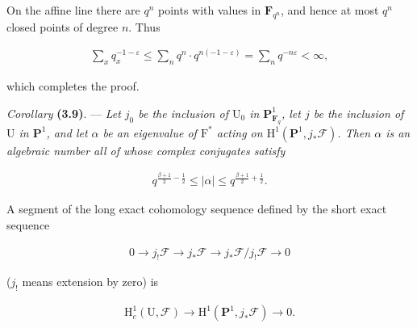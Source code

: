 \documentclass[10pt,leqno]{article}
\begin{document}
\noindent On the affine line there are \(q^{n}\) points with values in \(\mathbf{F}_{q^{n}}\), and hence at most \(q^{n}\) closed points of degree \(n\). Thus\par

\begin{equation*}\begin{gathered}\sum _{x} q_{x}^{- 1- \varepsilon } \leq  \sum _{n} q^{n}\cdot q^{n(- 1- \varepsilon )} = \sum _{n} q^{- n\varepsilon } < \infty ,\end{gathered}\end{equation*}

\noindent which completes the proof.\par

\noindent \emph{Corollary} \textbf{(3.9)}. — {\itshape Let \(j_{0}\) be the inclusion of \(\mathrm{U}_{0}\) in \(\mathbf{P}^{1}_{\mathbf{F}_{q}}\), let \(j\) be the inclusion of \(\mathrm{U}\) in \(\mathbf{P}^{1}\), and let \(\alpha \) be an eigenvalue of \(\mathrm{F}^{*}\) acting on \(\mathrm{H}^{1}(\mathbf{P}^{1},j_{*}\mathcal{F} )\). Then \(\alpha \) is an algebraic number all of whose complex conjugates satisfy}\par

\begin{equation*}\begin{gathered}q^{\frac{\beta+1}{2}- \frac{1}{2}} \leq  |\alpha | \leq  q^{\frac{\beta+1}{2}+\frac{1}{2}}.\end{gathered}\end{equation*}

\noindent \(\mathrm{A}\) segment of the long exact cohomology sequence defined by the short exact sequence\par

\begin{equation*}\begin{gathered}0 \longrightarrow  j_{!}\mathcal{F}  \longrightarrow  j_{*}\mathcal{F}  \longrightarrow  j_{*}\mathcal{F} /j_{!}\mathcal{F}  \longrightarrow  0\end{gathered}\end{equation*}

\noindent (\(j_{!}\) means extension by zero) is\par

\begin{equation*}\begin{gathered}\mathrm{H}_{c}^{1}(\mathrm{U},\mathcal{F} ) \longrightarrow  \mathrm{H}^{1}(\mathbf{P}^{1},j_{*}\mathcal{F} ) \longrightarrow  0.\end{gathered}\end{equation*}
\end{document}
